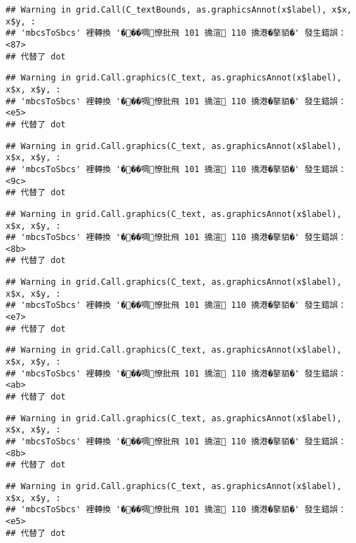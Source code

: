 \documentclass[
]{article}
\begin{document}
\begin{verbatim}
## Warning in grid.Call(C_textBounds, as.graphicsAnnot(x$label), x$x, x$y, :
## 'mbcsToSbcs' 裡轉換 '���啁憭批飛 101 撟渲 110 撟港�摮貊�' 發生錯誤：<87>
## 代替了 dot
\end{verbatim}

\begin{verbatim}
## Warning in grid.Call.graphics(C_text, as.graphicsAnnot(x$label), x$x, x$y, :
## 'mbcsToSbcs' 裡轉換 '���啁憭批飛 101 撟渲 110 撟港�摮貊�' 發生錯誤：<e5>
## 代替了 dot
\end{verbatim}

\begin{verbatim}
## Warning in grid.Call.graphics(C_text, as.graphicsAnnot(x$label), x$x, x$y, :
## 'mbcsToSbcs' 裡轉換 '���啁憭批飛 101 撟渲 110 撟港�摮貊�' 發生錯誤：<9c>
## 代替了 dot
\end{verbatim}

\begin{verbatim}
## Warning in grid.Call.graphics(C_text, as.graphicsAnnot(x$label), x$x, x$y, :
## 'mbcsToSbcs' 裡轉換 '���啁憭批飛 101 撟渲 110 撟港�摮貊�' 發生錯誤：<8b>
## 代替了 dot
\end{verbatim}

\begin{verbatim}
## Warning in grid.Call.graphics(C_text, as.graphicsAnnot(x$label), x$x, x$y, :
## 'mbcsToSbcs' 裡轉換 '���啁憭批飛 101 撟渲 110 撟港�摮貊�' 發生錯誤：<e7>
## 代替了 dot
\end{verbatim}

\begin{verbatim}
## Warning in grid.Call.graphics(C_text, as.graphicsAnnot(x$label), x$x, x$y, :
## 'mbcsToSbcs' 裡轉換 '���啁憭批飛 101 撟渲 110 撟港�摮貊�' 發生錯誤：<ab>
## 代替了 dot
\end{verbatim}

\begin{verbatim}
## Warning in grid.Call.graphics(C_text, as.graphicsAnnot(x$label), x$x, x$y, :
## 'mbcsToSbcs' 裡轉換 '���啁憭批飛 101 撟渲 110 撟港�摮貊�' 發生錯誤：<8b>
## 代替了 dot
\end{verbatim}

\begin{verbatim}
## Warning in grid.Call.graphics(C_text, as.graphicsAnnot(x$label), x$x, x$y, :
## 'mbcsToSbcs' 裡轉換 '���啁憭批飛 101 撟渲 110 撟港�摮貊�' 發生錯誤：<e5>
## 代替了 dot
\end{verbatim}
\end{document}
